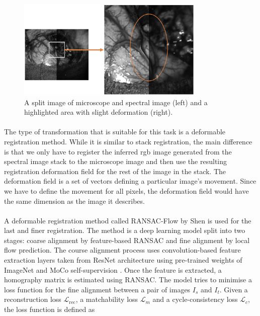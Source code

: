 \documentclass[12pt,oneside]{report}
\begin{document}
\begin{figure}[h]
\centering
\begin{minipage}[h]{\textwidth}
    \centering
    \includegraphics[width=0.8\textwidth]{figures/fine-not-match.png}
    \caption{A split image of microscope and spectral image (left) and a highlighted area with slight deformation (right).}
    \label{fig:fine-not-match}
\end{minipage}
\end{figure}

\paragraph{}
The type of transformation that is suitable for this task is a deformable registration method. While it is similar to stack registration, the main difference is that we only have to register the inferred \acrshort{rgb} image generated from the spectral image stack to the microscope image and then use the resulting registration deformation field for the rest of the image in the stack. The deformation field is a set of vectors defining a particular image's movement. Since we have to define the movement for all pixels, the deformation field would have the same dimension as the image it describes.

\paragraph{}
A deformable registration method called RANSAC-Flow by Shen \etal \cite{shen_ransac-flow_2020} is used for the last and finer registration. The method is a deep learning model split into two stages: coarse alignment by feature-based RANSAC \cite{fischler_random_1981} and fine alignment by local flow prediction. The course alignment process uses convolution-based feature extraction layers taken from ResNet architecture \cite{he_deep_2015} using pre-trained weights of ImageNet \cite{deng_imagenet_2009} and MoCo self-supervision \cite{he_momentum_2020}. Once the feature is extracted, a homography matrix is estimated using RANSAC. The model tries to minimise a loss function for the fine alignment between a pair of images $I_s$ and $I_t$. Given a reconstruction loss $\mathcal{L}_{\text{rec}}$, a matchability loss $\mathcal{L}_m$ and a cycle-consistency loss $\mathcal{L}_c$, the loss function is defined as
\end{document}
